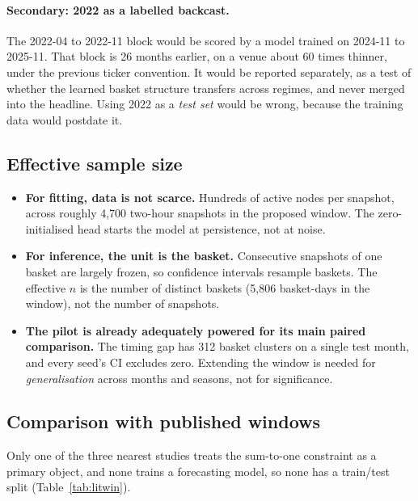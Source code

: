\documentclass[11pt,a4paper]{article}
\begin{document}
\paragraph{Secondary: 2022 as a labelled backcast.} The 2022-04 to 2022-11 block
would be scored by a model trained on 2024-11 to 2025-11. That block is 26 months
earlier, on a venue about 60 times thinner, under the previous ticker convention.
It would be reported separately, as a test of whether the learned basket
structure transfers across regimes, and never merged into the headline. Using
2022 as a \emph{test set} would be wrong, because the training data would
postdate it.

\subsection{Effective sample size}
\begin{itemize}
  \item \textbf{For fitting, data is not scarce.} Hundreds of active nodes per
    snapshot, across roughly 4{,}700 two-hour snapshots in the proposed window.
    The zero-initialised head starts the model at persistence, not at noise.
  \item \textbf{For inference, the unit is the basket.} Consecutive snapshots of
    one basket are largely frozen, so confidence intervals resample baskets.
    The effective $n$ is the number of distinct baskets (5{,}806 basket-days in
    the window), not the number of snapshots.
  \item \textbf{The pilot is already adequately powered for its main paired
    comparison.} The timing gap has 312 basket clusters on a single test month,
    and every seed's CI excludes zero. Extending the window is needed for
    \emph{generalisation} across months and seasons, not for significance.
\end{itemize}

\subsection{Comparison with published windows}
Only one of the three nearest studies treats the sum-to-one constraint as a
primary object, and none trains a forecasting model, so none has a train/test
split (Table~\ref{tab:litwin}).
\end{document}

